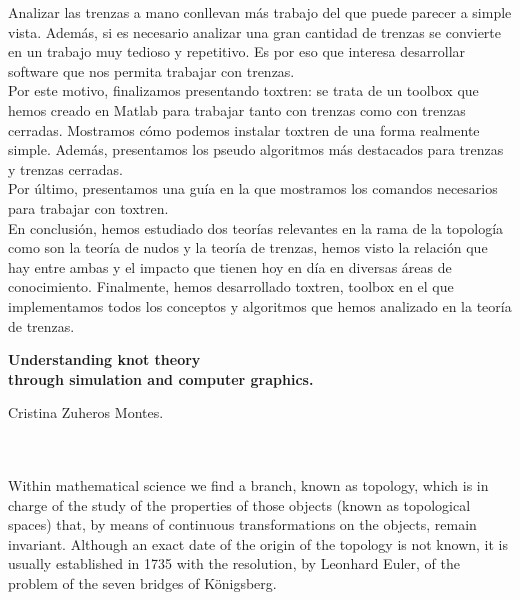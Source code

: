 Analizar las trenzas a mano conllevan más trabajo del que puede parecer a simple vista. Además, si es necesario analizar una gran cantidad de trenzas se convierte en un trabajo muy tedioso y repetitivo. Es por eso que interesa desarrollar software que nos permita trabajar con trenzas. \\

Por este motivo, finalizamos presentando toxtren: se trata de un toolbox que hemos creado en Matlab para trabajar tanto con trenzas como con trenzas cerradas. Mostramos cómo podemos instalar toxtren de una forma realmente simple. Además, presentamos los pseudo algoritmos más destacados para trenzas y trenzas cerradas.\\
Por último, presentamos una guía en la que mostramos los comandos necesarios para trabajar con toxtren. \\

En conclusión, hemos estudiado dos teorías relevantes en la rama de la topología como son la teoría de nudos y la teoría de trenzas, hemos visto la relación que hay entre ambas y el impacto que tienen hoy en día en diversas áreas de conocimiento. Finalmente, hemos desarrollado toxtren, toolbox en el que implementamos todos los conceptos y algoritmos que hemos analizado en la teoría de trenzas. 

 
\cleardoublepage


\thispagestyle{empty}

\begin{center}
{\large\bfseries Understanding knot theory \\
	through simulation and computer graphics.}\\
\end{center}
\begin{center}
Cristina Zuheros Montes.\\
\end{center}

\\

\vspace{0.7cm}
\\
Within mathematical science we find a branch, known as topology, which is in charge of the study of the properties of those objects (known as topological spaces) that, by means of continuous transformations on the objects, remain invariant. Although an exact date of the origin of the topology is not known, it is usually established in 1735 with the resolution, by Leonhard Euler, of the problem of the seven bridges of Königsberg.\\


